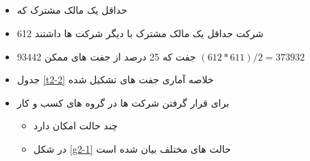 \subsection{ }
\begin{itemize}
	\item 
	حداقل یک مالک مشترک که 
		\item 
		612 شرکت حداقل یک مالک مشترک با دیگر شرکت ها داشتند
	\item 
	93442 جفت که 25 درصد از جفت های ممکن
	$ (612*611)/2 = 373932$

	\item 
	جدول
	 \ref{t2-2}
	 خلاصه آماری جفت های تشکیل شده
	\item 
	برای قرار گرفتن شرکت ها در گروه های کسب و کار 
	\begin{itemize}
		\item
		 چند حالت امکان دارد 
		 \item
		 در شکل 
		 \ref{g2-1}
		 حالت های مختلف بیان شده است
	\end{itemize}
	
\end{itemize}

 
\begin{LTR}
\end{LTR}


